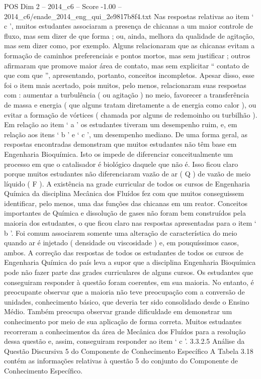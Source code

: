 \begin{textsample}{POS Dim 2 – 2014\_c6 – Score -1.00 – 2014\_c6/enade\_2014\_eng\_qui\_2e9817b8f4.txt}
Nas respostas relativas ao item ‘ c ’, muitos estudantes associaram a presença de chicanas a um maior controle de fluxo, mas sem dizer de que forma ; ou, ainda, melhora da qualidade de agitação, mas sem dizer como, por exemplo.
Alguns relacionaram que as chicanas evitam a formação de caminhos preferenciais e pontos mortos, mas sem justificar ; outros afirmaram que promove maior área de contato, mas sem explicitar “ contato de que com que ”, apresentando, portanto, conceitos incompletos.
Apesar disso, esse foi o item mais acertado, pois muitos, pelo menos, relacionaram suas respostas com : aumentar a turbulência ( ou agitação ) no meio, favorecer a transferência de massa e energia ( que alguns tratam diretamente a de energia como calor ), ou evitar a formação de vórtices ( chamada por alguns de redemoinho ou turbilhão ).
Em relação ao item ‘ a ’ os estudantes tiveram um desempenho ruim, e, em relação aos itens ‘ b ’ e ‘ c ’, um desempenho mediano.
De uma forma geral, as respostas encontradas demonstram que muitos estudantes não têm base em Engenharia Bioquímica.
Isto os impede de diferenciar conceitualmente um processo em que o catalisador é biológico daquele que não é.
Isso ficou claro porque muitos estudantes não diferenciaram vazão de ar ( Q ) de vazão de meio líquido ( F ).
A existência na grade curricular de todos os cursos de Engenharia Química da disciplina Mecânica dos Fluídos fez com que muitos conseguissem identificar, pelo menos, uma das funções das chicanas em um reator.
Conceitos importantes de Química e dissolução de gases não foram bem construídos pela maioria dos estudantes, o que ficou claro nas respostas apresentadas para o item ‘ b ’.
Foi comum associarem somente uma alteração de característica do meio quando ar é injetado ( densidade ou viscosidade ) e, em pouquíssimos casos, ambos.
A correção das respostas de todos os estudantes de todos os cursos de Engenharia Química do país leva a supor que a disciplina Engenharia Bioquímica pode não fazer parte das grades curriculares de alguns cursos.
Os estudantes que conseguiram responder à questão foram coerentes, em sua maioria.
No entanto, é preocupante observar que a maioria não teve preocupação com a conversão de unidades, conhecimento básico, que deveria ter sido consolidado desde o Ensino Médio.
Também preocupa observar grande dificuldade em demonstrar um conhecimento por meio de sua aplicação de forma correta.
Muitos estudantes recorreram a conhecimentos da área de Mecânica dos Fluídos para a resolução dessa questão e, assim, conseguiram responder ao item ‘ c ’. 3.3.2.5 Análise da Questão Discursiva 5 do Componente de Conhecimento Específico A Tabela 3.18 contém as informações relativas à questão 5 do conjunto do Componente de Conhecimento Específico.

\end{textsample}
